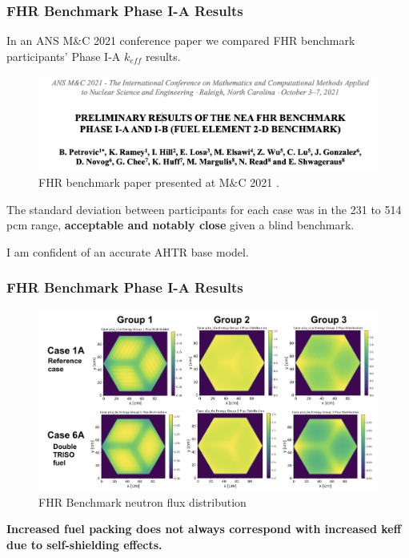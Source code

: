 \begin{frame}
    \frametitle{FHR Benchmark Phase I-A Results}
    In an ANS M$\&$C 2021 conference paper we compared FHR benchmark participants' 
    Phase I-A $k_{eff}$ results. 
    \begin{figure}[]
        \centering
        \includegraphics[width=0.85\linewidth]{figures/mnc.png} 
        \caption{FHR benchmark paper presented at M$\&$C 2021 
        \cite{petrovic_preliminary_2021}.}
    \end{figure}

    The standard deviation between participants for each case was in the 231 to 514 
    pcm range, \textbf{acceptable and notably close} given a blind benchmark.

    I am confident of an accurate AHTR base model. 
\end{frame}

\begin{frame}
    \frametitle{FHR Benchmark Phase I-A Results}
    \begin{figure}
        \centering
        \includegraphics[width=\linewidth]{figures/phase1a-flux.png} 
        \vspace{-0.5cm}
        \caption{FHR Benchmark neutron flux distribution}
    \end{figure}
    \vspace{-0.3cm}
    \textbf{Increased fuel packing does not always correspond with increased keff 
    due to self-shielding effects.}
\end{frame}
